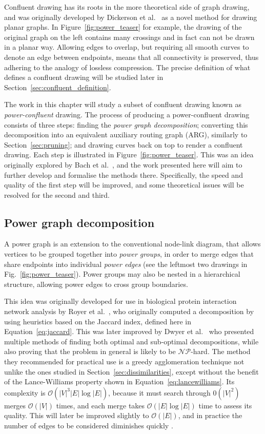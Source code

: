 Confluent drawing has its roots in the more theoretical side of graph drawing, and was originally developed by Dickerson et al.\ \cite{Dickerson2005} as a novel method for drawing planar graphs. In Figure~\ref{fig:power_teaser} for example, the drawing of the original graph on the left contains many crossings and in fact can not be drawn in a planar way. Allowing edges to overlap, but requiring all smooth curves to denote an edge between endpoints, means that all connectivity is preserved, thus adhering to the analogy of lossless compression.
The precise definition of what defines a confluent drawing will be studied later in Section~\ref{sec:confluent_definition}.

The work in this chapter will study a subset of confluent drawing known as \emph{power-confluent} drawing.
The process of producing a power-confluent drawing consists of three steps: finding the \emph{power graph decomposition}; converting this decomposition into an equivalent auxiliary routing graph (ARG), similarly to Section~\ref{sec:pruning}; and drawing curves back on top to render a confluent drawing. Each step is illustrated in Figure~\ref{fig:power_teaser}. This was an idea originally explored by Bach et al.\ \cite{Bach2017}, and the work presented here will aim to further develop and formalise the methods there.
Specifically, the speed and quality of the first step will be improved, and some theoretical issues will be resolved for the second and third.

\subsection{Power graph decomposition}
\label{sec:power_graph}
A power graph is an extension to the conventional node-link diagram, that allows vertices to be grouped together into \emph{power groups}, in order to merge edges that share endpoints into individual \emph{power edges} (see the leftmost two drawings in Fig.~\ref{fig:power_teaser}). Power groups may also be nested in a hierarchical structure, allowing power edges to cross group boundaries.

This idea was originally developed for use in biological protein interaction network analysis by Royer et al.\ \cite{Royer2008}, who originally computed a decomposition by using heuristics based on the Jaccard index, defined here in Equation~\ref{eq:jaccard}. This was later improved by Dwyer et al.\ \cite{Dwyer2014} who presented multiple methods of finding both optimal and sub-optimal decompositions, while also proving that the problem in general is likely to be $\mathcal{NP}$-hard. The method they recommended for practical use is a greedy agglomeration technique not unlike the ones studied in Section~\ref{sec:dissimilarities}, except without the benefit of the Lance-Williams property shown in Equation~\eqref{eq:lancewilliams}. Its complexity is $\mathcal{O}(|V|^3|E|\log|E|)$, because it must search through $\mathcal{0}(|V|^2)$ merges $\mathcal{O}(|V|)$ times, and each merge takes $\mathcal{O}(|E|\log|E|)$ time to assess its quality. This will later be improved slightly to $\mathcal{O}(|E|)$, and in practice the number of edges to be considered diminishes quickly \cite{Dwyer2014}.

